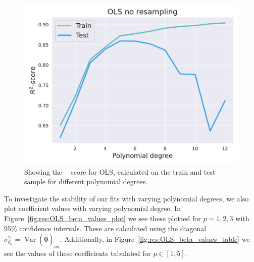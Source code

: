 \documentclass[twocolumn,english,notitlepage]{article}
\renewcommand{\vec}[1]{\boldsymbol{#1}}
\renewcommand{\var}{\operatorname{Var}}
\DeclareMathOperator{\Rsquared}{R^2}
\begin{document}
                \begin{figure}[H]
                    \centering
                    \includegraphics[width=\linewidth]{OLS_r2_noresample.pdf}
                    \caption{Showing the $\Rsquared$ score for OLS, calculated on the train and test sample for different polynomial degrees.}
                    \label{fig:res:OLS_R2_noresample}
                \end{figure}

                To investigate the stability of our fits with varying polynomial degrees, we also plot coefficient values with varying polynomial degree. In Figure~\ref{fig:res:OLS_beta_values_plot} we see these plotted for $p = 1,2,3$ with 95\% confidence intervals. These are calculated using the diagonal $\sigma^2_{\theta_a} = \var{(\vec{\hat{\theta}})_{aa}}$. Additionally, in Figure~\ref{fig:res:OLS_beta_values_table} we see the values of these coefficients tabulated for $p \in [1,5]$.
\end{document}
